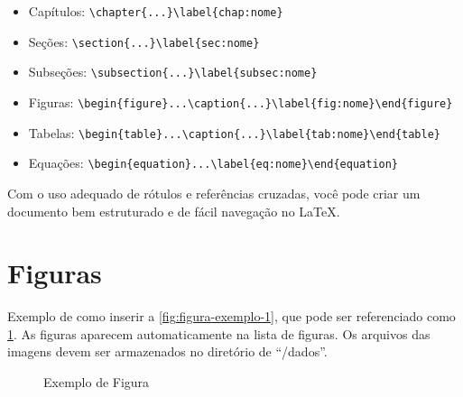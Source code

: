 \begin{itemize}
\item Capítulos: \texttt{\textbackslash chapter\{...\}\textbackslash label\{chap:nome\}}
\item Seções: \texttt{\textbackslash section\{...\}\textbackslash label\{sec:nome\}}
\item Subseções: \texttt{\textbackslash subsection\{...\}\textbackslash label\{subsec:nome\}}
\item Figuras: \texttt{\textbackslash begin\{figure\}...\textbackslash caption\{...\}\textbackslash label\{fig:nome\}\textbackslash end\{figure\}}
\item Tabelas: \texttt{\textbackslash begin\{table\}...\textbackslash caption\{...\}\textbackslash label\{tab:nome\}\textbackslash end\{table\}}
\item Equações: \texttt{\textbackslash begin\{equation\}...\textbackslash label\{eq:nome\}\textbackslash end\{equation\}}
\end{itemize}
\vspace{0.5cm}
Com o uso adequado de rótulos e referências cruzadas, você pode criar um documento bem estruturado e de fácil navegação no \LaTeX{}. 

\section{Figuras}
\label{sec:figuras}

Exemplo de como inserir a \autoref{fig:figura-exemplo-1}, que pode ser referenciado como \cref{fig:figura-exemplo-1}. As figuras aparecem automaticamente na lista de figuras. Os arquivos das imagens devem ser armazenados no diretório de ``/dados''.

\begin{figure}[!htb]
    \centering
    \caption{Exemplo de Figura}
    \begin{minipage}{\wd0}
        \label{fig:figura-exemplo-1}
    \end{minipage}
\end{figure}



